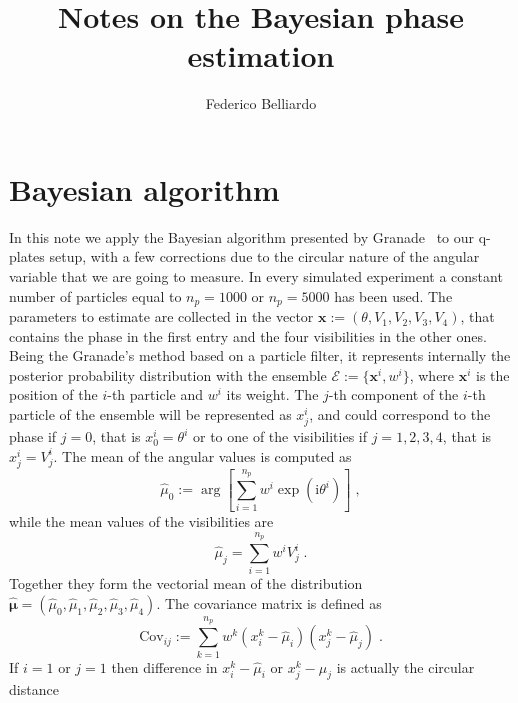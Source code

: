 \documentclass[aps, pra, 10pt, twocolumn, superscriptaddress,floatfix]{revtex4-1}
\newcommand{\mi}{\mathrm{i}} %
\begin{document}
%
\title{Notes on the Bayesian phase estimation} 
%


\author{Federico Belliardo}

\maketitle

\section{Bayesian algorithm}
%
In this note we apply the Bayesian algorithm presented by Granade~\cite{Granade2012} to our q-plates setup, with a few corrections due to the circular nature of the angular variable that we are going to measure. In every simulated experiment  a constant number of particles equal to $n_p = 1000$ or $n_p = 5000$ has been used. The parameters to estimate are collected in the vector $\boldsymbol{x} := \left( \theta, V_1, V_2, V_3, V_4 \right)$, that contains the phase in the first entry and the four visibilities in the other ones. Being the Granade's method based on a particle filter, it represents internally the posterior probability distribution with the ensemble $\mathcal{E} := \lbrace \boldsymbol{x}^i, w^i \rbrace$, where $\boldsymbol{x}^i$ is the position of the $i$-th particle and $w^i$ its weight. The $j$-th component of the $i$-th particle of the ensemble will be represented as $x_j^i$, and could correspond to the phase if $j=0$, that is $x^i_0 = \theta^i$ or to one of the visibilities if $j=1, 2, 3, 4$, that is $x^i_j = V^i_j$. The mean of the angular values is computed as
%
\begin{equation}
	\hat{\mu}_0 := \arg \left[ \sum_{i=1}^{n_{p}} w^i \exp \left( \mi \theta^i \right) \right] \; ,
\end{equation}
%
while the mean values of the visibilities are
%
\begin{equation}
	\hat{\mu}_j = \sum_{i=1}^{n_p} w^i V^i_j \; .
\end{equation}
%
Together they form the vectorial mean of the distribution $\boldsymbol{\hat{\mu}} = (\hat{\mu}_0, \hat{\mu}_1, \hat{\mu}_2, \hat{\mu}_3, \hat{\mu}_4)$. The covariance matrix is defined as
%
\begin{equation}
	\text{Cov}_{ij} := \sum_{k=1}^{n_{p}} w^k (x^k_i - \hat{\mu}_i)  (x^k_j - \hat{\mu}_j) \; .
\end{equation}
%
If $i=1$ or $j=1$ then difference in $x^k_i - \hat{\mu}_i$ or $x^k_j - \hat{\mu}_j$ is actually the circular distance
\end{document}

